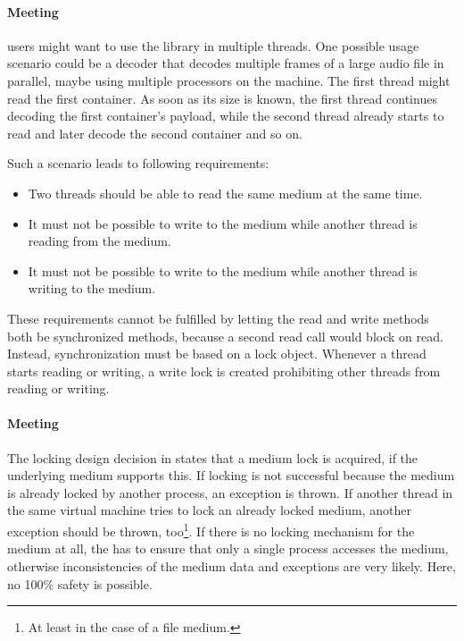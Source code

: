 
\paragraph{Meeting \REQUcrlThreadSafety{}}
\label{sec:MeetingThreadSafety}

\LibName{} users might want to use the library in multiple threads. One possible usage scenario could be a decoder that decodes multiple frames of a large audio file in parallel, maybe using multiple processors on the machine. The first thread might read the first container. As soon as its size is known, the first thread continues decoding the first container's payload, while the second thread already starts to read and later decode the second container and so on.

Such a scenario leads to following requirements:
\begin{itemize}
	\item Two threads should be able to read the same medium at the same time.
	\item It must not be possible to write to the medium while another thread is reading from the medium.
	\item It must not be possible to write to the medium while another thread is writing to the medium.
\end{itemize}

These requirements cannot be fulfilled by letting the read and write methods both be synchronized methods, because a second read call would block on read. Instead, synchronization must be based on a lock object. Whenever a thread starts reading or writing, a write lock is created prohibiting other threads from reading or writing.



\paragraph{Meeting \REQUcrlAvoidInconsistencies{}}
\label{sec:MeetingAvoidInconsistencies}

The locking design decision in  states that a medium lock is acquired, if the underlying medium supports this. If locking is not successful because the medium is already locked by another process, an exception is thrown. If another thread in the same virtual machine tries to lock an already locked medium, another exception should be thrown, too\footnote{At least in the case of a file medium.}. If there is no locking mechanism for the medium at all, the \ACTORuser{} has to ensure that only a single process accesses the medium, otherwise inconsistencies of the medium data and \LibName{} exceptions are very likely. Here, no 100\% safety is possible.

